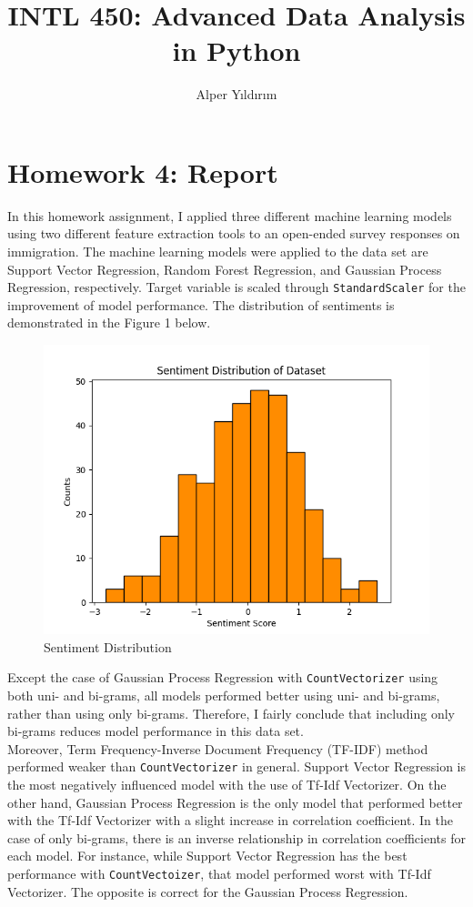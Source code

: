 \documentclass[a4paper]{article}
\title{INTL 450: Advanced Data Analysis in Python}
\author{Alper Yıldırım}
\begin{document}
\maketitle

\section*{Homework 4: Report}

	In this homework assignment, I applied three different machine learning models using two different feature extraction tools to an open-ended survey responses on immigration. The machine learning models were applied to the data set are Support Vector Regression, Random Forest Regression, and Gaussian Process Regression, respectively. Target variable is scaled through \verb|StandardScaler| for the improvement of model performance. The distribution of sentiments is demonstrated in the Figure 1 below.
	
\begin{figure}[htp]
    \centering
    \includegraphics[width=12cm]{sentiment_distribution.png}
    \caption{Sentiment Distribution}
\end{figure}
	
	Except the case of Gaussian Process Regression with \verb|CountVectorizer| using both uni- and bi-grams, all models performed better using uni- and bi-grams, rather than using only bi-grams. Therefore, I fairly conclude that including only bi-grams reduces model performance in this data set. \\

	Moreover, Term Frequency-Inverse Document Frequency (TF-IDF) method performed weaker than \verb|CountVectorizer| in general. Support Vector Regression is the most negatively influenced model with the use of Tf-Idf Vectorizer. On the other hand, Gaussian Process Regression is the only model that performed better with the Tf-Idf Vectorizer with a slight increase in correlation coefficient. In the case of only bi-grams, there is an inverse relationship in correlation coefficients for each model. For instance, while Support Vector Regression has the best performance with 
    \verb|CountVectoizer|, that model performed worst with Tf-Idf Vectorizer. The opposite is correct for the Gaussian Process Regression. \\
	
\end{document}
